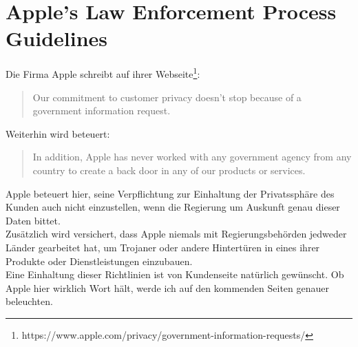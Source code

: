 \section{Apple's Law Enforcement Process Guidelines}
	Die Firma Apple schreibt auf ihrer
	Webseite\footnote{https://www.apple.com/privacy/government-information-requests/}:
	\begin{quote}
	Our commitment to customer privacy doesn't stop because of a government
	information request.
	\end{quote}
	Weiterhin wird beteuert:
	\begin{quote}
	In addition, Apple has never worked with any government agency from any country to create a back 
	door in any of our products or services.
	\end{quote}
	Apple beteuert hier, seine Verpflichtung zur Einhaltung der Privatssphäre des
	Kunden auch nicht einzustellen, wenn die Regierung um Auskunft genau dieser
	Daten bittet.\\
	Zusätzlich wird versichert, dass Apple niemals mit Regierungsbehörden
	jedweder Länder gearbeitet hat, um Trojaner oder andere Hintertüren in eines
	ihrer Produkte oder Dienstleistungen einzubauen.\\
	Eine Einhaltung dieser Richtlinien ist von Kundenseite natürlich gewünscht.
	Ob Apple hier wirklich Wort hält, werde ich auf den kommenden Seiten genauer
	beleuchten.
